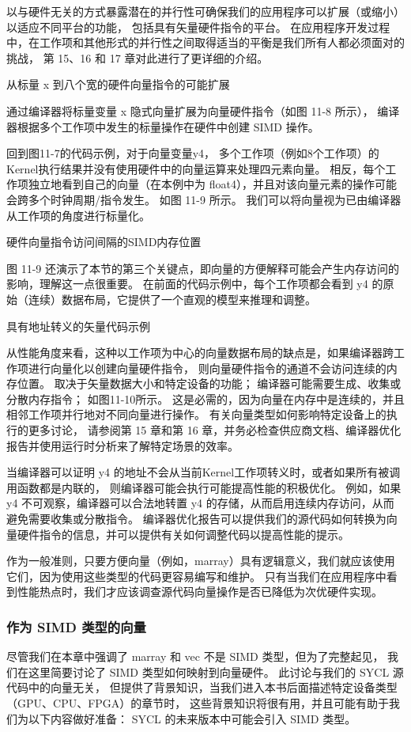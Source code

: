 以与硬件无关的方式暴露潜在的并行性可确保我们的应用程序可以扩展（或缩小）以适应不同平台的功能，
包括具有矢量硬件指令的平台。 
在应用程序开发过程中，在工作项和其他形式的并行性之间取得适当的平衡是我们所有人都必须面对的挑战，
第 15、16 和 17 章对此进行了更详细的介绍。

{\color{red} 从标量 x 到八个宽的硬件向量指令的可能扩展}

通过编译器将标量变量 x 隐式向量扩展为向量硬件指令（如图 11-8 所示），
编译器根据多个工作项中发生的标量操作在硬件中创建 SIMD 操作。

回到图11-7的代码示例，对于向量变量y4，
多个工作项（例如8个工作项）的Kernel执行结果并没有使用硬件中的向量运算来处理四元素向量。 
相反，每个工作项独立地看到自己的向量（在本例中为 float4），并且对该向量元素的操作可能会跨多个时钟周期/指令发生。 
如图 11-9 所示。 我们可以将向量视为已由编译器从工作项的角度进行标量化。

{\color{red} 硬件向量指令访问间隔的SIMD内存位置}

图 11-9 还演示了本节的第三个关键点，即向量的方便解释可能会产生内存访问的影响，理解这一点很重要。 
在前面的代码示例中，每个工作项都会看到 y4 的原始（连续）数据布局，它提供了一个直观的模型来推理和调整。

{\color{red} 具有地址转义的矢量代码示例}

从性能角度来看，这种以工作项为中心的向量数据布局的缺点是，如果编译器跨工作项进行向量化以创建向量硬件指令，
则向量硬件指令的通道不会访问连续的内存位置。 取决于矢量数据大小和特定设备的功能； 
编译器可能需要生成、收集或分散内存指令； 
如图11-10所示。 这是必需的，因为向量在内存中是连续的，并且相邻工作项并行地对不同向量进行操作。 
有关向量类型如何影响特定设备上的执行的更多讨论，
请参阅第 15 章和第 16 章，并务必检查供应商文档、编译器优化报告并使用运行时分析来了解特定场景的效率。

当编译器可以证明 y4 的地址不会从当前Kernel工作项转义时，或者如果所有被调用函数都是内联的，
则编译器可能会执行可能提高性能的积极优化。 
例如，如果 y4 不可观察，编译器可以合法地转置 y4 的存储，从而启用连续内存访问，从而避免需要收集或分散指令。 
编译器优化报告可以提供我们的源代码如何转换为向量硬件指令的信息，并可以提供有关如何调整代码以提高性能的提示。

作为一般准则，只要方便向量（例如，marray）具有逻辑意义，我们就应该使用它们，因为使用这些类型的代码更容易编写和维护。 
只有当我们在应用程序中看到性能热点时，我们才应该调查源代码向量操作是否已降低为次优硬件实现。

\subsubsection{作为 SIMD 类型的向量}
尽管我们在本章中强调了 marray 和 vec 不是 SIMD 类型，但为了完整起见，
我们在这里简要讨论了 SIMD 类型如何映射到向量硬件。 
此讨论与我们的 SYCL 源代码中的向量无关，
但提供了背景知识，当我们进入本书后面描述特定设备类型（GPU、CPU、FPGA）的章节时，
这些背景知识将很有用，并且可能有助于我们为以下内容做好准备： SYCL 的未来版本中可能会引入 SIMD 类型。

